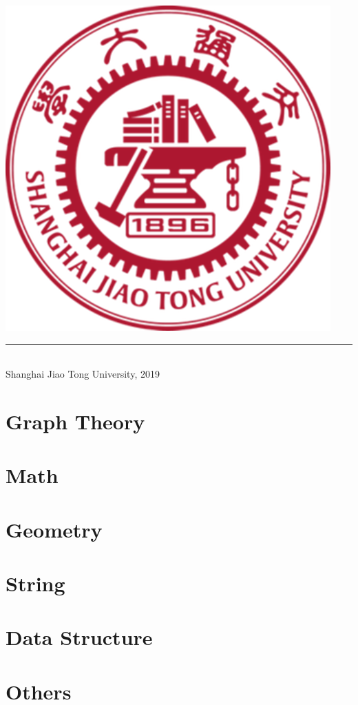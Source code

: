 \documentclass[titlepage, openany]{book}
\newcommand{\mychapter}[2]{
    \chapter{#1}
    
    \cleardoublepage
}
\begin{document}
\begin{titlepage}
        \includegraphics[scale=0.4]{pictures/sjtu.png}\\
        \rule{\linewidth}{0.3mm}\\[0.4cm]
        \small{Shanghai Jiao Tong University, 2019}
    \end{titlepage}
    \cleardoublepage
    \setcounter{page}{1}
    \tableofcontents
    \cleardoublepage
    \setcounter{page}{1}

    \mychapter{Graph Theory}{graph_theory.tex}
    \mychapter{Math}{math.tex}
    \mychapter{Geometry}{geometry.tex}
    \mychapter{String}{string.tex}
    \mychapter{Data Structure}{data_structure.tex}
    \mychapter{Others}{others.tex}
\end{document}
